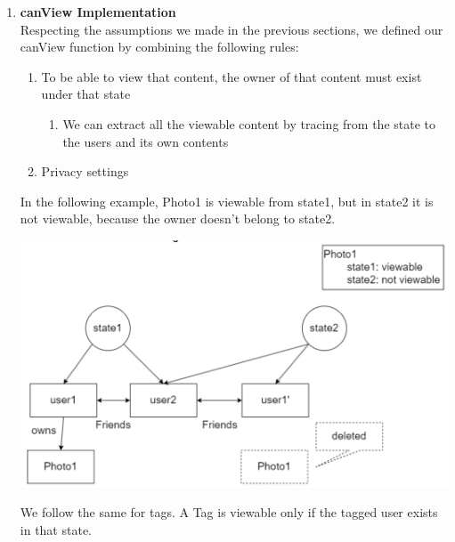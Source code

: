 \documentclass[titlepage]{article}
\begin{document}
\begin{enumerate}
	\item \textbf{canView Implementation}\\
	      Respecting the assumptions we made in the previous sections, we defined our canView function by combining the following rules:
	      \begin{enumerate}
		      \item To be able to view that content, the owner of that content must exist under that state
		            \begin{enumerate}
			            \item We can extract all the viewable content by tracing from the state to the users and its own contents
		            \end{enumerate}
		      \item Privacy settings
	      \end{enumerate}
	      In the following example, Photo1 is viewable from state1, but in state2 it is not viewable, because the owner doesn’t belong to state2.

	      \includegraphics[width=6in]{images/canview.png}

	      We follow the same for tags. A Tag is viewable only if the tagged user exists in that state.
\end{enumerate}
\end{document}
